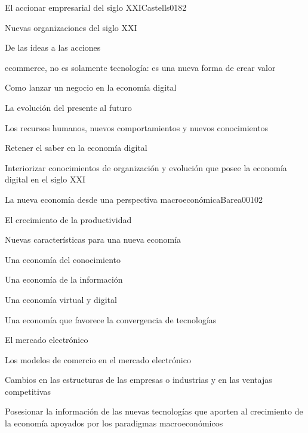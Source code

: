 \begin{syllabus}
\begin{unit}{El accionar empresarial del siglo XXI}{Castells01}{8}{2}
   \begin{topics}
      \item Nuevas organizaciones del siglo XXI
	\item De las ideas a las acciones
	\item ecommerce, no es solamente tecnología: es una nueva forma de crear valor
	\item Como lanzar un negocio en la economía digital
	\item La evolución del presente al futuro
	\item Los recursos humanos, nuevos comportamientos y nuevos conocimientos
	\item Retener el saber en la economía digital
   \end{topics}

   \begin{learningoutcomes}
      \item Interiorizar conocimientos de organización y evolución que posee la economía digital en el siglo XXI
   \end{learningoutcomes}
\end{unit}

\begin{unit}{La nueva economía desde una perspectiva macroeconómica}{Barea00}{10}{2}
   \begin{topics}
      \item El crecimiento de la productividad
	\item Nuevas características para una nueva economía
	\item Una economía del conocimiento
	\item Una economía de la información
	\item Una economía virtual y digital
	\item Una economía que favorece la convergencia de tecnologías
	\item El mercado electrónico
	\item Los modelos de comercio en el mercado electrónico
	\item Cambios en las estructuras de las empresas o industrias y en las ventajas competitivas
  \end{topics}

   \begin{learningoutcomes}
      \item Posesionar la información de las nuevas tecnologías que aporten al crecimiento de la economía apoyados por los paradigmas macroeconómicos
   \end{learningoutcomes}
\end{unit}


\end{syllabus}
